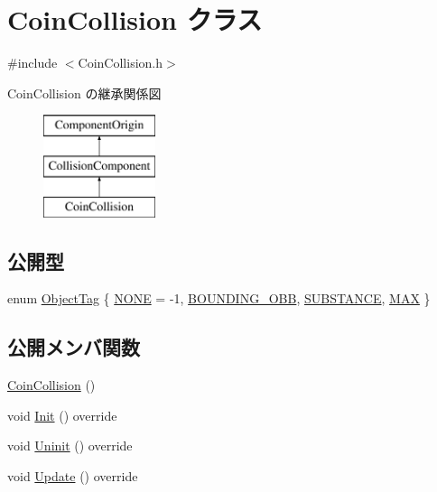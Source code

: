\hypertarget{class_coin_collision}{}\section{Coin\+Collision クラス}
\label{class_coin_collision}


{\ttfamily \#include $<$Coin\+Collision.\+h$>$}

Coin\+Collision の継承関係図\begin{figure}[H]
\begin{center}
\leavevmode
\includegraphics[height=3.000000cm]{class_coin_collision}
\end{center}
\end{figure}
\subsection*{公開型}
\begin{DoxyCompactItemize}
\item 
enum \mbox{\hyperlink{class_coin_collision_ade7912345747f522fd895e87621ce049}{Object\+Tag}} \{ \mbox{\hyperlink{class_coin_collision_ade7912345747f522fd895e87621ce049aa520033eb3664c6f516082c22efd5d17}{N\+O\+NE}} = -\/1, 
\mbox{\hyperlink{class_coin_collision_ade7912345747f522fd895e87621ce049a003d6865c3e811586f2b96d25c4b6375}{B\+O\+U\+N\+D\+I\+N\+G\+\_\+\+O\+BB}}, 
\mbox{\hyperlink{class_coin_collision_ade7912345747f522fd895e87621ce049ab3dfdeacfa9cf71c167dfb2faec4612f}{S\+U\+B\+S\+T\+A\+N\+CE}}, 
\mbox{\hyperlink{class_coin_collision_ade7912345747f522fd895e87621ce049afe668be7d8cc9606f4c5be2220c38281}{M\+AX}}
 \}
\end{DoxyCompactItemize}
\subsection*{公開メンバ関数}
\begin{DoxyCompactItemize}
\item 
\mbox{\hyperlink{class_coin_collision_a30288ed12410957ccf72f26da10de856}{Coin\+Collision}} ()
\item 
void \mbox{\hyperlink{class_coin_collision_a4119a7decab2410a4ada3568ad0c132d}{Init}} () override
\item 
void \mbox{\hyperlink{class_coin_collision_aa852afdcdbedcf82809df9c7fd99be9e}{Uninit}} () override
\item 
void \mbox{\hyperlink{class_coin_collision_a981fd9b1b8c688a757a456a56d80501b}{Update}} () override
\end{DoxyCompactItemize}


